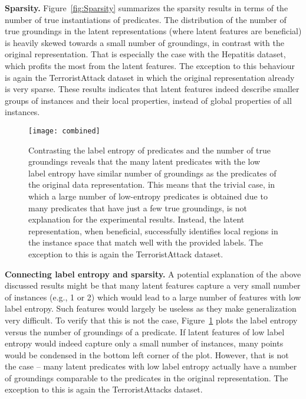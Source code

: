 \textbf{Sparsity.}
Figure~\ref{fig:Sparsity} summarizes the sparsity results in terms of the number of true instantiations of predicates.
The distribution of the number of true groundings in the latent representations (where latent features are beneficial) is heavily skewed towards a small number of groundings, in contrast with the original representation.
That is especially the case with the Hepatitis dataset, which profits the most from the latent features.
The exception to this behaviour is again the TerroristAttack dataset in which the original representation already is very sparse.
These results indicates that latent features indeed describe smaller groups of instances and their local properties, instead of global properties of all instances. 





\begin{figure}
	\centering
	\medskip
    \texttt{[image: combined]}
    \caption{Contrasting the label entropy of predicates and the number of true groundings reveals that the many latent predicates with the low label entropy have similar number of groundings as the predicates of the original data representation. This means that the trivial case, in which a large number of low-entropy predicates is obtained due to many predicates that have just a few true groundings, is not explanation for the experimental results. Instead, the latent representation, when beneficial, successfully identifies local regions in the instance space that match well with the provided labels. The exception to this is again the TerroristAttack dataset.}
    \label{fig:EntropyVsSparsity}
\end{figure}




\textbf{Connecting label entropy and sparsity.}
A potential explanation of the above discussed results might be that many latent features capture a very small number of instances (e.g., 1 or 2) which would lead to a large number of features with low label entropy.
Such features would largely be useless as they make generalization very difficult.
To verify that this is not the case, Figure~\ref{fig:EntropyVsSparsity} plots the label entropy versus the number of groundings of a predicate.
If latent features of low label entropy would indeed capture only a small number of instances, many points would be condensed in the bottom left corner of the plot.
However, that is not the case -- many latent predicates with low label entropy actually have a number of groundings comparable to the predicates in the original representation.
The exception to this is again the TerroristAttacks dataset.

